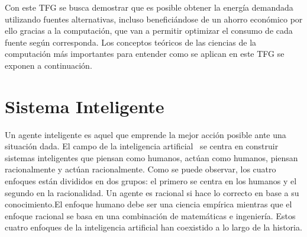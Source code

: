 Con este \gls{TFG} se busca demostrar que es posible obtener la energía demandada utilizando fuentes alternativas, incluso beneficiándose de un ahorro económico por ello gracias a la computación, que van a permitir optimizar el consumo de cada fuente según corresponda. Los conceptos teóricos de las ciencias de la computación más importantes para entender como se aplican en este \gls{TFG} se exponen a continuación.

\section{Sistema Inteligente}
Un agente inteligente es aquel que emprende la mejor acción posible ante una situación dada. El campo de la inteligencia artificial~\cite{Russ06} se centra en construir sistemas inteligentes que piensan como humanos, actúan como humanos, piensan racionalmente y actúan racionalmente. Como se puede observar, los cuatro enfoques están divididos en dos grupos: el primero se centra en los humanos y el segundo en la racionalidad. Un agente es racional si hace lo correcto en base a su conocimiento.El enfoque humano debe ser una ciencia empírica mientras que el enfoque racional se basa en una combinación de matemáticas e ingeniería. Estos cuatro enfoques de la inteligencia artificial han coexistido a lo largo de la historia.\\
